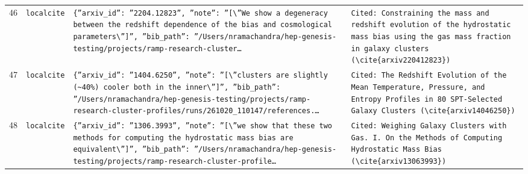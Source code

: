 \documentclass[11pt,a4paper]{article}
\begin{document}
\begin{longtable}{@{}p{}p{}p{}p{}@{}}
46 & \texttt{local}\newline\texttt{cite} & \texttt{\{''arxiv\_\allowbreak{}id'':\allowbreak{} ''2204.12823'',\allowbreak{} ''note'':\allowbreak{} ''[\textbackslash{}\allowbreak{}''We show a degeneracy between the redshift dependence of the bias and cosmological parameters\textbackslash{}\allowbreak{}'']\allowbreak{}'',\allowbreak{} ''bib\_\allowbreak{}path'':\allowbreak{} ''/\allowbreak{}Users/\allowbreak{}nramachandra/\allowbreak{}hep-genesis-testing/\allowbreak{}projects/\allowbreak{}ramp-research-cluster\ldots{}\allowbreak{}} & \texttt{Cited:\allowbreak{} Constraining the mass and redshift evolution of the hydrostatic mass bias using the gas mass fraction in galaxy clusters (\textbackslash{}\allowbreak{}cite\{arxiv220412823\}\allowbreak{})\allowbreak{}} \\
47 & \texttt{local}\newline\texttt{cite} & \texttt{\{''arxiv\_\allowbreak{}id'':\allowbreak{} ''1404.6250'',\allowbreak{} ''note'':\allowbreak{} ''[\textbackslash{}\allowbreak{}''clusters are slightly (\textasciitilde{}\allowbreak{}40\%)\allowbreak{} cooler both in the inner\textbackslash{}\allowbreak{}'']\allowbreak{}'',\allowbreak{} ''bib\_\allowbreak{}path'':\allowbreak{} ''/\allowbreak{}Users/\allowbreak{}nramachandra/\allowbreak{}hep-genesis-testing/\allowbreak{}projects/\allowbreak{}ramp-research-cluster-profiles/\allowbreak{}runs/\allowbreak{}261020\_\allowbreak{}110147/\allowbreak{}references.\ldots{}\allowbreak{}} & \texttt{Cited:\allowbreak{} The Redshift Evolution of the Mean Temperature,\allowbreak{} Pressure,\allowbreak{} and Entropy Profiles in 80 SPT-Selected Galaxy Clusters (\textbackslash{}\allowbreak{}cite\{arxiv14046250\}\allowbreak{})\allowbreak{}} \\
48 & \texttt{local}\newline\texttt{cite} & \texttt{\{''arxiv\_\allowbreak{}id'':\allowbreak{} ''1306.3993'',\allowbreak{} ''note'':\allowbreak{} ''[\textbackslash{}\allowbreak{}''we show that these two methods for computing the hydrostatic mass bias are equivalent\textbackslash{}\allowbreak{}'']\allowbreak{}'',\allowbreak{} ''bib\_\allowbreak{}path'':\allowbreak{} ''/\allowbreak{}Users/\allowbreak{}nramachandra/\allowbreak{}hep-genesis-testing/\allowbreak{}projects/\allowbreak{}ramp-research-cluster-profile\ldots{}\allowbreak{}} & \texttt{Cited:\allowbreak{} Weighing Galaxy Clusters with Gas. I. On the Methods of Computing Hydrostatic Mass Bias (\textbackslash{}\allowbreak{}cite\{arxiv13063993\}\allowbreak{})\allowbreak{}} \\

\end{longtable}
\end{document}
